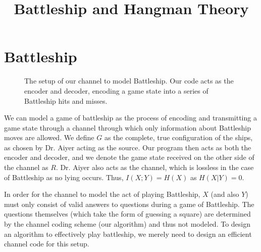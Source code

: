 \documentclass[conference,letterpaper]{IEEEtran}
\begin{document}
\title{Battleship and Hangman Theory}
\author{
\IEEEauthorblockA{} \and {}}
\maketitle
\IEEEpeerreviewmaketitle


\section{Battleship}

\begin{figure}
\centering
{}
\caption{The setup of our channel to model Battleship. Our code acts as the encoder and decoder, encoding a game state into a series of Battleship hits and misses.}
\label{scheme}
\end{figure}

We can model a game of battleship as the process of encoding and transmitting a game state through a channel through which only information about Battleship moves are allowed. We define $G$ as the complete, true configuration of the ships, as chosen by Dr. Aiyer acting as the source. Our program then acts as both the encoder and decoder, and we denote the game state received on the other side of the channel as $R$. Dr. Aiyer also acts as the channel, which is lossless in the case of Battleship as no lying occurs. Thus, $I(X;Y) = H(X)$ as $H(X|Y) = 0$.

In order for the channel to model the act of playing Battleship, $X$ (and also $Y$) must only consist of valid answers to questions during a game of Battleship. The questions themselves (which take the form of guessing a square) are determined by the channel coding scheme (our algorithm) and thus not modeled. To design an algorithm to effectively play battleship, we merely need to design an efficient channel code for this setup.
\end{document}
